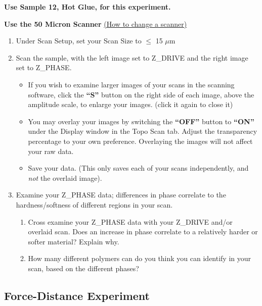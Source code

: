 \documentclass{../lab}
\begin{document}
\textbf{Use Sample 12, Hot Glue, for this experiment.}

\textbf{Use the 50 Micron Scanner} \hyperref[subsec:ChangingScanners]{(How to change a scanner)}

\begin{enumerate}
    \item Under Scan Setup, set your Scan Size to $\leq$ 15 $\mu$m

    \item Scan the sample, with the left image set to Z\_DRIVE and the right image set to Z\_PHASE.

    \begin{itemize}
        \item If you wish to examine larger images of your scans in the scanning software, click the \textbf{``S''} button on the right side of each image, above the amplitude scale, to enlarge your images.  (click it again to close it)

        \item You may overlay your images by switching the\textbf{ ``OFF''} button to \textbf{``ON''} under the Display window in the Topo Scan tab.  Adjust the transparency percentage to your own preference.  Overlaying the images will not affect your raw data.

        \item Save your data. (This only saves each of your scans independently, and \emph{not} the overlaid image).
    \end{itemize}

    \item Examine your Z\_PHASE data; differences in phase correlate to the hardness/softness of different regions in your scan.

    \begin{enumerate}
        \item Cross examine your Z\_PHASE data with your Z\_DRIVE and/or overlaid scan.  Does an increase in phase correlate to a relatively harder or softer material? Explain why.

        \item How many different polymers can do you think you can identify in your scan, based on the different phases?
    \end{enumerate}

\end{enumerate}

\subsection{Force-Distance Experiment}
\label{subsec:ForceDistance}
\end{document}
